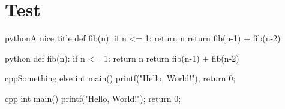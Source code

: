 \documentclass{article}
\begin{document}
\section{Test}

\begin{listingsbox}{python}{A nice title}
def fib(n):
if n <= 1:
    return n
return fib(n-1) + fib(n-2)
\end{listingsbox}

\begin{listingsbox}{python}{}
def fib(n):
if n <= 1:
    return n
return fib(n-1) + fib(n-2)
\end{listingsbox}

\begin{listingsbox}{cpp}{Something else}
int main()
{
    printf("Hello, World!\n");
    return 0;
}
\end{listingsbox}

\begin{listingsbox}{cpp}{}
int main()
{
    printf("Hello, World!\n");
    return 0;
}
\end{listingsbox}

\end{document}
